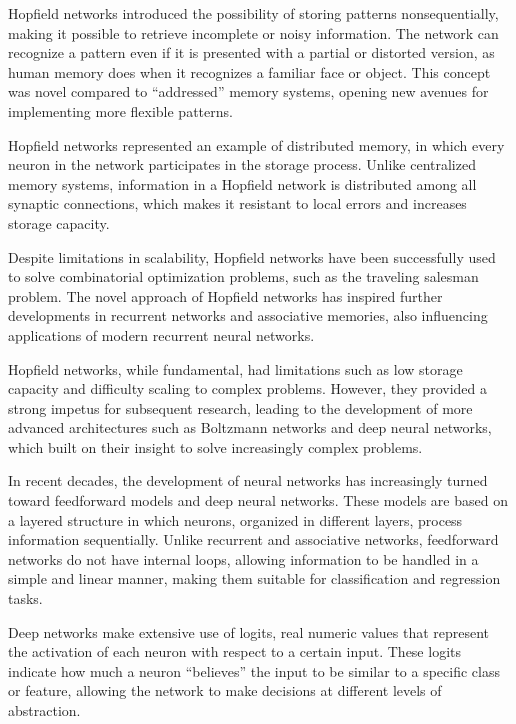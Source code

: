 \bigskip\noindent Hopfield networks introduced the possibility of storing patterns nonsequentially, making it possible to retrieve incomplete or noisy information. The network can recognize a pattern even if it is presented with a partial or distorted version, as human memory does when it recognizes a familiar face or object. This concept was novel compared to “addressed” memory systems, opening new avenues for implementing more flexible patterns.

\noindent Hopfield networks represented an example of distributed memory, in which every neuron in the network participates in the storage process. Unlike centralized memory systems, information in a Hopfield network is distributed among all synaptic connections, which makes it resistant to local errors and increases storage capacity.

\noindent Despite limitations in scalability, Hopfield networks have been successfully used to solve combinatorial optimization problems, such as the traveling salesman problem. The novel approach of Hopfield networks has inspired further developments in recurrent networks and associative memories, also influencing applications of modern recurrent neural networks.

\noindent Hopfield networks, while fundamental, had limitations such as low storage capacity and difficulty scaling to complex problems. However, they provided a strong impetus for subsequent research, leading to the development of more advanced architectures such as Boltzmann networks and deep neural networks, which built on their insight to solve increasingly complex problems.

\bigskip\noindent In recent decades, the development of neural networks has increasingly turned toward feedforward models and deep neural networks. These models are based on a layered structure in which neurons, organized in different layers, process information sequentially. Unlike recurrent and associative networks, feedforward networks do not have internal loops, allowing information to be handled in a simple and linear manner, making them suitable for classification and regression tasks.

\noindent Deep networks make extensive use of logits, real numeric values that represent the activation of each neuron with respect to a certain input. These logits indicate how much a neuron “believes” the input to be similar to a specific class or feature, allowing the network to make decisions at different levels of abstraction.

